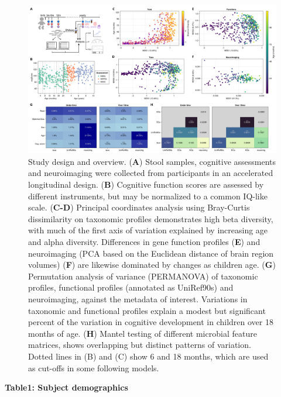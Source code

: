 \documentclass[a4paper]{article}
\begin{document}
\begin{figure}
    \centering
    \includegraphics[width=\textwidth]{assets/Figure1.png}
    \caption{
        Study design and overview. (\textbf{A}) Stool samples, cognitive assessments and
        neuroimaging were collected from participants in an accelerated
        longitudinal design. (\textbf{B}) Cognitive function scores are assessed by
        different instruments, but may be normalized to a common IQ-like scale.
        (\textbf{C-D}) Principal coordinates analysis using Bray-Curtis dissimilarity on
        taxonomic profiles demonstrates high beta diversity, with much of the
        first axis of variation explained by increasing age and alpha diversity.
        Differences in gene function profiles (\textbf{E}) and neuroimaging (PCA based on
        the Euclidean distance of brain region volumes) (\textbf{F}) are likewise
        dominated by changes as children age. (\textbf{G}) Permutation analysis of
        variance (PERMANOVA) of taxonomic profiles, functional profiles
        (annotated as UniRef90s) and neuroimaging, against the metadata of
        interest. Variations in taxonomic and functional profiles explain a
        modest but significant percent of the variation in cognitive development
        in children over 18 months of age. (\textbf{H}) Mantel testing of different
        microbial feature matrices, shows overlapping but distinct patterns of
        variation. Dotted lines in (B) and (C) show 6 and 18 months, which are
        used as cut-offs in some following models.
    }
    \label{fig:Figure 1}
\end{figure}

\textbf{Table1: Subject demographics}
\end{document}
